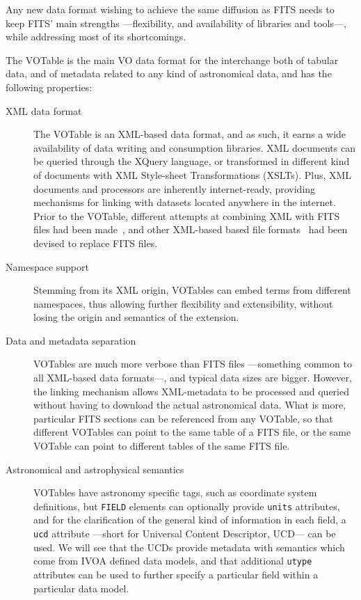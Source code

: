 			Any new data format wishing to achieve the same
			diffusion as FITS needs to keep FITS' main strengths
			---flexibility, and availability of libraries and
			tools---, while addressing most of its shortcomings.
			
			 The VOTable is the main VO data format for the
			interchange both of tabular data, and of metadata
			related to any kind of astronomical data, and has the
			following properties:
			
			\begin{description}
				\item[XML data format] The VOTable is an XML-based
				data format, and as such, it earns a wide
				availability of data writing and consumption
				libraries. XML documents can be queried through the
				XQuery language, or transformed in different kind
				of documents with XML Style-sheet Transformations
				(XSLTs). Plus, XML documents and processors are
				inherently internet-ready, providing mechanisms for
				linking with datasets located anywhere in the
				internet. Prior to the VOTable, different attempts
				at combining XML with FITS files had been
				made~\cite{2000ASPC..216...83O,
				2001ASPC..238..487T}, and other XML-based based
				file formats~\cite{Blackburn:1999fu,
				2000AAS...19711602S} had been devised to replace
				FITS files.
				
				 \item[Namespace support] Stemming from its XML
				origin, VOTables can embed terms from different
				namespaces, thus allowing further flexibility and
				extensibility, without losing the origin and
				semantics of the extension.
				
				 \item[Data and metadata separation] VOTables are
				much more verbose than FITS files ---something
				common to all XML-based data formats---, and
				typical data sizes are bigger. However, the linking
				mechanism allows XML-metadata to be processed and
				queried without having to download the actual
				astronomical data. What is more, particular FITS
				sections can be referenced from any VOTable, so
				that different VOTables can point to the same table
				of a FITS file, or the same VOTable can point to
				different tables of the same FITS file.
				
				 \item[Astronomical and astrophysical semantics]
				VOTables have astronomy specific tags, such as
				coordinate system definitions, but \texttt{FIELD}
				elements can optionally provide \texttt{units}
				attributes, and for the clarification of the
				general kind of information in each field, a
				\texttt{ucd} attribute ---short for Universal
				Content Descriptor, UCD--- can be used. We will see
				that the UCDs provide metadata with semantics which
				come from IVOA defined data models, and that
				additional \texttt{utype} attributes can be used to
				further specify a particular field within a
				particular data model.
				

\end{description}
